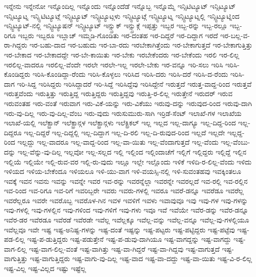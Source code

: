 {ಇನ್ನೇನು
ಇನ್ನೇನೋ
ಇನ್ನೊಂದಿಲ್ಲ
ಇನ್ನೊಂದು
ಇನ್ನೊಂದೆಡೆ
ಇನ್ನೊಬ್ಬ
ಇನ್ನೊಮ್ಮೆ
ಇನ್ಸಿಟಿಟ್ಯೂಟ್
ಇನ್ಸಿಟ್ಯೂಟ್
ಇನ್ಸಿಟ್ಯೂಟ್ನ
ಇನ್ಸ್ಟಿಟಿಟ್ಯೂಟ್ಗೆ
ಇನ್ಸ್ಟಿಟ್ಯೂಟ್
ಇನ್ಸ್ಟಿಟ್ಯೂಟ್ಗಳು
ಇನ್ಸ್ಟಿಟ್ಯೂಟ್ಗೆ
ಇನ್ಸ್ಟಿಟ್ಯೂಟ್ನ
ಇನ್ಸ್ಟಿಟ್ಯೂಟ್ನಲ್ಲಿ
ಇನ್ಸ್ಟಿಟ್ಯೂಟ್ನಿಂದ
ಇನ್ಸ್ಟಿಟ್ಯೂಟ್-ನಲ್ಲಿ
ಇನ್ಸ್ಟಿಟ್ಯೂಷನ್
ಇನ್ಸ್ಟಿಟ್ಯೂಟ್
ಇನ್ಸ್ಬ್ರುಕ್
ಇನ್ಸ್ಬ್ರುಕ್ಗೆ
ಇಪ್ಪತ್ತು
ಇಬ್ಬರ
ಇಬ್ಬ-ರನ್ನು
ಇಬ್ಬ-ರಲ್ಲೂ
ಇಬ್ಬ-ರಿಗೂ
ಇಬ್ಬರು
ಇಬ್ಬರೂ
ಇಬ್ಲಾಚ್
ಇಮ್ಮಡಿ-ಗೊಂಡಿತು
ಇರ-ದಂತಹ
ಇರ-ದಿದ್ದರೆ
ಇರ-ದಿದ್ದಾಗ
ಇರದೆ
ಇರ-ಬಲ್ಲ-ವ-ರಾ-ಗಿದ್ದರು
ಇರ-ಬಹು-ದಾದ
ಇರ-ಬಹುದು
ಇರ-ಬಾ-ರದು
ಇರಬೇಕಾಗಿತ್ತೆಂದು
ಇರ-ಬೇಕಾಗುತ್ತದೆ
ಇರ-ಬೇಕಾಗುತ್ತಿತ್ತು
ಇರ-ಬೇಕಾದ
ಇರ-ಬೇಕಾದದ್ದೇ
ಇರ-ಬೇ-ಕಾಯಿತು
ಇರ-ಬೇಕು
ಇರಬೇಕೆಂದರು
ಇರ-ಬೇಕೆಂದು
ಇರಲಿ
ಇರ-ಲಿಲ್ಲ
ಇರಲಿಲ್ಲ-ವಾದರೂ
ಇರಲಿಲ್ಲ-ವೆಂದೇ
ಇರಲೇ
ಇರಲೇ-ಇಲ್ಲ
ಇರಲೇ-ಬೇಕು
ಇರ-ವನ್ನೂ
ಇರಿ-ಸಲು
ಇರಿಸಿ
ಇರಿಸಿ-ಕೊಂಡಿದ್ದರು
ಇರಿಸಿ-ಕೊಂಡಿದ್ದಾ-ರೆಂದು
ಇರಿಸಿ-ಕೊಳ್ಳಲು
ಇರಿಸಿದ
ಇರಿಸಿ-ದರು
ಇರಿಸಿ-ದರೆ
ಇರಿಸಿ-ದ-ರೆಂದು
ಇರಿಸಿ-ದಾಗ
ಇರಿ-ಸಿದ್ದ
ಇರಿಸಿದ್ದರು
ಇರಿಸಿದ್ದಾದರೆ
ಇರಿ-ಸಿದ್ದೆ
ಇರಿಸಿದ್ದೆವು
ಇರಿಸಿದ್ದೇನೆ
ಇರುತ್ತದೆ
ಇರುತ್ತ-ವಾದ್ದ-ರಿಂದ
ಇರುತ್ತವೆ
ಇರುತ್ತವೆಂದು
ಇರುತ್ತಿತ್ತು
ಇರುತ್ತಿದ್ದ
ಇರುತ್ತಿದ್ದರು
ಇರುತ್ತಿದ್ದವು
ಇರುತ್ತಿ-ರ-ಲಿಲ್ಲ
ಇರುತ್ತೇನೆ
ಇರುದರ್
ಇರುವ
ಇರುವಂತಹ
ಇರು-ವಂತೆ
ಇರುವಾಗ
ಇರು-ವಿಕೆ-ಯನ್ನು
ಇರು-ವಿಕೆಯು
ಇರುವು-ದನ್ನು
ಇರುವುದ-ರಿಂದ
ಇರುವು-ದಾಗಿ
ಇರು-ವು-ದಿಲ್ಲ
ಇರು-ವು-ದಿಲ್ಲ-ವೆಂಬ
ಇರು-ವುದು
ಇರುಸುಮುರು-ಸಾಗಿ
ಇರ್ರಿಡೆ-ಸೆಂಟ್
ಇಲಾಖೆ-ಗಳ
ಇಲಾಖೆಯ
ಇಲಾಖೆ-ಯಲ್ಲಿ
ಇಲೆಕ್ಟ್ರಾನ್
ಇಲೆಕ್ಟ್ರಾನ್ಗಳ
ಇಲೆಕ್ಟ್ರಾನ್ಗಳು
ಇಲೆಕ್ಟ್ರಿಕಲ್
ಇಲ್ಲ
ಇಲ್ಲದ
ಇಲ್ಲ-ದಾಗ್ಯೂ
ಇಲ್ಲ-ದಿದ್ದ-ರಿಂದ
ಇಲ್ಲ-ದಿದ್ದರೂ
ಇಲ್ಲ-ದಿದ್ದರೆ
ಇಲ್ಲ-ದಿದ್ದಲ್ಲಿ
ಇಲ್ಲ-ದಿದ್ದಾಗ
ಇಲ್ಲ-ದಿ-ರಲಿ
ಇಲ್ಲ-ದಿ-ರುವುದ-ರಿಂದ
ಇಲ್ಲದೆ
ಇಲ್ಲದೇ
ಇಲ್ಲದ್ದ-ರಿಂದ
ಇಲ್ಲದ್ದು
ಇಲ್ಲ-ವಾದರೂ
ಇಲ್ಲ-ವಾದ್ದ-ರಿಂದ
ಇಲ್ಲ-ವಾ-ಯಿತು
ಇಲ್ಲ-ವೆಂದಾಗುತ್ತದೆ
ಇಲ್ಲ-ವೆಂದು
ಇಲ್ಲ-ವೆಂಬು-ದನ್ನು
ಇಲ್ಲ-ವೆನ್ನು-ವು-ದಿಲ್ಲ
ಇಲ್ಲವೋ
ಇಲ್ಲ-ಸಲ್ಲದ
ಇಲ್ಲಿ
ಇಲ್ಲಿಂದ
ಇಲ್ಲಿಂದಾಚೆಗೆ
ಇಲ್ಲಿಗೆ
ಇಲ್ಲಿದ್ದರು
ಇಲ್ಲಿದ್ದೆ
ಇಲ್ಲಿನ
ಇಲ್ಲಿಯೆ
ಇಲ್ಲಿಯೇ
ಇಲ್ಲಿ-ರುವ-ವರ
ಇಲ್ಲಿ-ರು-ವುದು
ಇಲ್ಲೂ
ಇಲ್ಲೇ
ಇಲ್ಲೊಂದು
ಇಳಿಕೆ
ಇಳಿದಿ-ರ-ಲಿಲ್ಲ-ವೆಂದು
ಇಳಿದು
ಇಳಿಯದ
ಇಳಿಯ-ಬೇಕೆಂದೂ
ಇಳಿಯಲೂ
ಇಳಿ-ಯು-ವಾಗ
ಇಳಿ-ವಯಸ್ಸಿ-ನಲ್ಲಿ
ಇಳಿ-ಸುವಂತಹವು
ಇವಕ್ಕಿಂತಲೂ
ಇವಕ್ಕೆ
ಇವನ
ಇವನು
ಇವನ್ನು
ಇವನ್ನೇ
ಇವರ
ಇವ-ರನ್ನು
ಇವರನ್ನೆಲ್ಲಾ
ಇವರನ್ನೇ
ಇವರಲ್ಲದೆ
ಇವ-ರಲ್ಲಿ
ಇವ-ರಲ್ಲಿನ
ಇವ-ರಿಂದ
ಇವ-ರಿಗೂ
ಇವ-ರಿಗೆ
ಇವರಿಬ್ಬರೇ
ಇವರು
ಇವರು-ಗಳಲ್ಲಿ
ಇವರೂ
ಇವರೆ-ಡನ್ನೂ
ಇವರೆಡೂ
ಇವರೆಲ್ಲ
ಇವರೆಲ್ಲರೂ
ಇವರೇ
ಇವರೊಬ್ಬ
ಇವರೊಳ-ಗಿನ
ಇವಳ
ಇವಳಿಗೆ
ಇವಳು
ಇವಾವುವೂ
ಇವು
ಇವು-ಗಳ
ಇವು-ಗಳನ್ನು
ಇವು-ಗಳಲ್ಲಿ
ಇವು-ಗಳಲ್ಲಿನ
ಇವು-ಗಳಿಂದ
ಇವು-ಗಳಿಗೆ
ಇವು-ಗಳು
ಇವೂ
ಇವೆ
ಇವೆಯೇ
ಇವೆರ-ಡನ್ನು
ಇವೆರ-ಡನ್ನೂ
ಇವೆರ-ಡರ
ಇವೆರಡೂ
ಇವೆರಡೆ
ಇವೆರಡೇ
ಇವೆಲ್ಲ
ಇವೆಲ್ಲಕ್ಕೂ
ಇವೆಲ್ಲ-ವನ್ನು
ಇವೆಲ್ಲ-ವನ್ನೂ
ಇವೆಲ್ಲ-ವು-ಗಳಲ್ಲಿಯೂ
ಇವೆಲ್ಲವೂ
ಇವೇ
ಇಷ್ಟ
ಇಷ್ಟ-ಅನಿಷ್ಟ-ಗಳನ್ನು
ಇಷ್ಟ-ದಂತೆ
ಇಷ್ಟನ್ನು
ಇಷ್ಟ-ಪಟ್ಟರು
ಇಷ್ಟ-ಪಟ್ಟಿದ್ದರು
ಇಷ್ಟ-ಪಟ್ಟೆವು
ಇಷ್ಟ-ಪಡ-ಲಿಲ್ಲ
ಇಷ್ಟ-ಪ-ಡುತ್ತಿದ್ದರು
ಇಷ್ಟ-ಪಡುತ್ತೇನೆ
ಇಷ್ಟ-ಪ-ಡುವು-ದಾಗಿಯೂ
ಇಷ್ಟ-ವಾಗದ್ದನ್ನು
ಇಷ್ಟ-ವಾಗದ್ದು
ಇಷ್ಟ-ವಾಗ-ಲಿಲ್ಲ
ಇಷ್ಟ-ವಾಗ-ಲಿಲ್ಲ-ವಂತೆ
ಇಷ್ಟ-ವಾಗಿತ್ತು
ಇಷ್ಟ-ವಾ-ಗಿದ್ದರೆ
ಇಷ್ಟ-ವಾ-ಗಿದ್ದವು
ಇಷ್ಟ-ವಾಗುತ್ತದೆ
ಇಷ್ಟ-ವಾಗುತ್ತಿತ್ತು
ಇಷ್ಟ-ವಾಗುತ್ತಿದ್ದರು
ಇಷ್ಟ-ವಾಗು-ವು-ದಿಲ್ಲ
ಇಷ್ಟ-ವಾದ
ಇಷ್ಟ-ವಾ-ದದ್ದು
ಇಷ್ಟ-ವಾ-ಯಿತು
ಇಷ್ಟ-ವಿ-ರ-ಲಿಲ್ಲ
ಇಷ್ಟ-ವಿಲ್ಲ
ಇಷ್ಟ-ವಿಲ್ಲದ
ಇಷ್ಟು
ಇಷ್ಟೆಲ್ಲ
}
